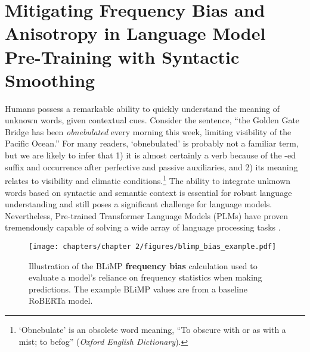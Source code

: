 \chapter{Mitigating Frequency Bias and Anisotropy in Language Model Pre-Training with Syntactic Smoothing}

Humans possess a remarkable ability to quickly understand the meaning of unknown words, given contextual cues. Consider the sentence, ``the Golden Gate Bridge has been \emph{obnebulated} every morning this week, limiting visibility of the Pacific Ocean.'' For many readers, `obnebulated' is probably not a familiar term, but we are likely to infer that 1) it is almost certainly a verb because of the -ed suffix and occurrence after perfective and passive auxiliaries, and 2) its meaning relates to visibility and climatic conditions.\footnote{ `Obnebulate' is an obsolete word meaning, ``To obscure with or as with a mist; to befog'' (\emph{Oxford English Dictionary}).} The ability to integrate unknown words based on syntactic and semantic context is essential for robust language understanding and still poses a significant challenge for language models. Nevertheless, Pre-trained Transformer Language Models (PLMs) have proven tremendously capable of solving a wide array of language processing tasks \citep{touvron2023llama, chowdhery2023palm}. 

\begin{figure}[ht!]
    \centering
    \texttt{[image: chapters/chapter 2/figures/blimp\_bias\_example.pdf]}
    \caption{Illustration of the BLiMP \textbf{frequency bias} calculation used to evaluate a model's reliance on frequency statistics when making predictions. The example BLiMP values are from a baseline RoBERTa model.}
    \label{fig:blimp_bias}
    \vspace{-1em}
\end{figure}


